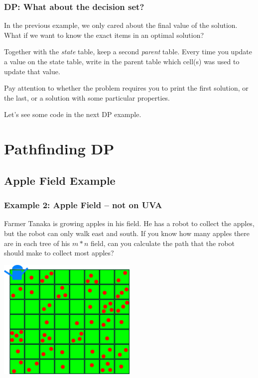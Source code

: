 \documentclass{beamer}
\begin{document}
\begin{frame}
  \frametitle{DP: What about the decision set?}

  \begin{block}{}
  In the previous example, we only cared about the final value of the
  solution. What if we want to know the exact items in an optimal
  solution?
  \end{block}

  \medskip

  Together with the \emph{state} table, keep a second \emph{parent} table.
  Every time you update a value on the state table, write in the parent table
  which cell(s) was used to update that value.

  \medskip

  Pay attention to whether the problem requires you to print the first
  solution, or the last, or a solution with some particular
  properties.

  \bigskip

  Let's see some code in the next DP example.
\end{frame}



\section{Pathfinding DP}
\subsection{Apple Field Example}
\begin{frame}
  \frametitle{Example 2: Apple Field -- not on UVA}

  \begin{block}{}
  {\smaller
  Farmer Tanaka is growing apples in his field. He has a robot to collect the apples, but
  the robot can only walk east and south. If you know how many apples there are in each
  tree of his $m * n$ field, can you calculate the path that the robot should make to collect
  most apples?}
  \end{block}

  \begin{center}
    \includegraphics[width=0.5\textwidth]{../img/applefield}
  \end{center}
\end{frame}
\end{document}
